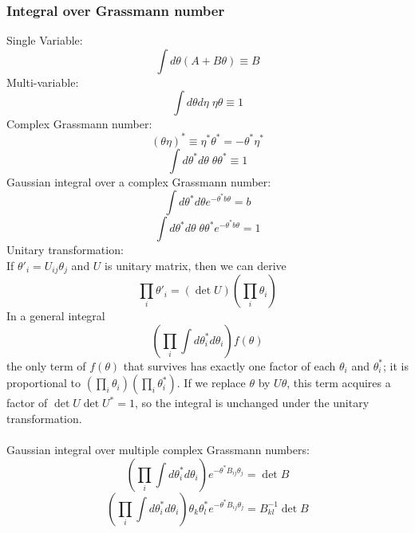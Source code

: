 \subsubsection{Integral over Grassmann number}
\noindent
Single Variable:
\[\int d\theta (A + B\theta) \equiv B\]
Multi-variable:
\[\int d\theta d\eta \; \eta \theta \equiv 1\]
Complex Grassmann number:
\[(\theta \eta)^* \equiv \eta^* \theta^* = -\theta^* \eta^*\]
\[\int d\theta^* d\theta \; \theta \theta^* \equiv 1\]
Gaussian integral over a complex Grassmann number:
\[\int d\theta^* d\theta e^{-\theta^* b \theta} = b\]
\[\int d\theta^* d\theta \; \theta \theta^* e^{-\theta^* b \theta}  = 1\]
Unitary transformation:\\
If $\theta'_i = U_{ij}\theta_j$ and $U$ is unitary matrix, then we can derive
\[\prod_i \theta'_i = (\det U) (\prod_i \theta_i)\]
In a general integral
\[(\prod_i \int d\theta^*_i d\theta_i) f(\theta)\]
the only term of $f(\theta)$ that survives has exactly one factor of each $\theta_i$ and $\theta^*_i$; it is proportional to $(\prod_i \theta_i)(\prod_i \theta^*_i)$. If we replace $\theta$ by $U\theta$, this term acquires a factor of $\det U \det U^* = 1$, so the integral is unchanged under the unitary transformation.\\ \\
Gaussian integral over multiple complex Grassmann numbers:
\[(\prod_i \int d\theta^*_i d\theta_i) e^{-\theta^* B_{ij}\theta_j} = \det B\]
\[(\prod_i \int d\theta^*_i d\theta_i) \theta_k \theta^*_l e^{-\theta^* B_{ij}\theta_j} =B^{-1}_{kl} \det B\]

